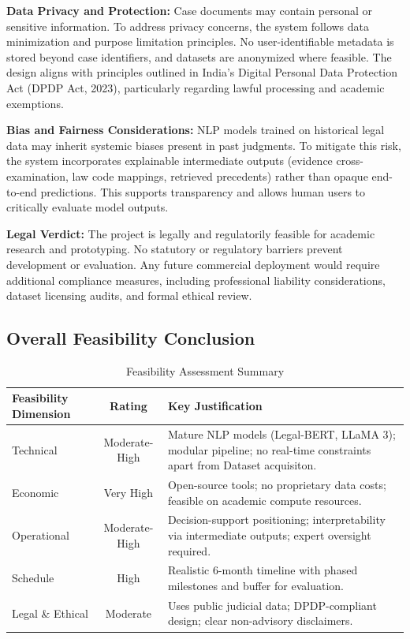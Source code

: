 \textbf{Data Privacy and Protection:}
Case documents may contain personal or sensitive information. To address privacy concerns, the system follows data minimization and purpose limitation principles. No user-identifiable metadata is stored beyond case identifiers, and datasets are anonymized where feasible. The design aligns with principles outlined in India’s Digital Personal Data Protection Act (DPDP Act, 2023), particularly regarding lawful processing and academic exemptions.

\textbf{Bias and Fairness Considerations:}
NLP models trained on historical legal data may inherit systemic biases present in past judgments. To mitigate this risk, the system incorporates explainable intermediate outputs (evidence cross-examination, law code mappings, retrieved precedents) rather than opaque end-to-end predictions. This supports transparency and allows human users to critically evaluate model outputs.

\textbf{Legal Verdict:}
The project is legally and regulatorily feasible for academic research and prototyping. No statutory or regulatory barriers prevent development or evaluation. Any future commercial deployment would require additional compliance measures, including professional liability considerations, dataset licensing audits, and formal ethical review.







\subsection{Overall Feasibility Conclusion}
\begin{table}[h]
	\caption{Feasibility Assessment Summary}
	\label{tab:feasibility}
	\centering
	\begin{tabular}{|l|c|p{6.5cm}|}
		\hline
		\textbf{Feasibility Dimension} & \textbf{Rating} & \textbf{Key Justification} \\ \hline
		Technical & Moderate-High & Mature NLP models (Legal-BERT, LLaMA 3); modular pipeline; no real-time constraints apart from Dataset acquisiton. \\ \hline
		Economic & Very High & Open-source tools; no proprietary data costs; feasible on academic compute resources. \\ \hline
		Operational & Moderate-High & Decision-support positioning; interpretability via intermediate outputs; expert oversight required. \\ \hline
		Schedule & High & Realistic 6-month timeline with phased milestones and buffer for evaluation. \\ \hline
		Legal \& Ethical & Moderate & Uses public judicial data; DPDP-compliant design; clear non-advisory disclaimers. \\ \hline
	\end{tabular}
\end{table}

